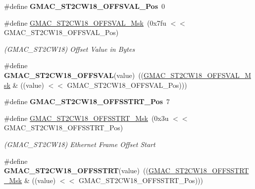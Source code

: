 \begin{DoxyCompactItemize}
\item 
\mbox{\label{group__SAME70__GMAC_ga02e7f5470d3163c67fa5af9a19ae26a8}} 
\#define {\bfseries G\+M\+A\+C\+\_\+\+S\+T2\+C\+W18\+\_\+\+O\+F\+F\+S\+V\+A\+L\+\_\+\+Pos}~0
\item 
\mbox{\label{group__SAME70__GMAC_ga2d765aad9c2975eb3297ba1ac64ab5b7}} 
\#define \mbox{\hyperlink{group__SAME70__GMAC_ga2d765aad9c2975eb3297ba1ac64ab5b7}{G\+M\+A\+C\+\_\+\+S\+T2\+C\+W18\+\_\+\+O\+F\+F\+S\+V\+A\+L\+\_\+\+Msk}}~(0x7fu $<$$<$ G\+M\+A\+C\+\_\+\+S\+T2\+C\+W18\+\_\+\+O\+F\+F\+S\+V\+A\+L\+\_\+\+Pos)
\begin{DoxyCompactList}\small\item\em (G\+M\+A\+C\+\_\+\+S\+T2\+C\+W18) Offset Value in Bytes \end{DoxyCompactList}\item 
\mbox{\label{group__SAME70__GMAC_ga65af16da3d122731540633c21a99f63b}} 
\#define {\bfseries G\+M\+A\+C\+\_\+\+S\+T2\+C\+W18\+\_\+\+O\+F\+F\+S\+V\+AL}(value)~((\mbox{\hyperlink{group__SAMV71__GMAC_ga2d765aad9c2975eb3297ba1ac64ab5b7}{G\+M\+A\+C\+\_\+\+S\+T2\+C\+W18\+\_\+\+O\+F\+F\+S\+V\+A\+L\+\_\+\+Msk}} \& ((value) $<$$<$ G\+M\+A\+C\+\_\+\+S\+T2\+C\+W18\+\_\+\+O\+F\+F\+S\+V\+A\+L\+\_\+\+Pos)))
\item 
\mbox{\label{group__SAME70__GMAC_ga1246ed3e88b926bd90dc08eae286f87d}} 
\#define {\bfseries G\+M\+A\+C\+\_\+\+S\+T2\+C\+W18\+\_\+\+O\+F\+F\+S\+S\+T\+R\+T\+\_\+\+Pos}~7
\item 
\mbox{\label{group__SAME70__GMAC_ga40187676eaa690fe2922327ed07602eb}} 
\#define \mbox{\hyperlink{group__SAME70__GMAC_ga40187676eaa690fe2922327ed07602eb}{G\+M\+A\+C\+\_\+\+S\+T2\+C\+W18\+\_\+\+O\+F\+F\+S\+S\+T\+R\+T\+\_\+\+Msk}}~(0x3u $<$$<$ G\+M\+A\+C\+\_\+\+S\+T2\+C\+W18\+\_\+\+O\+F\+F\+S\+S\+T\+R\+T\+\_\+\+Pos)
\begin{DoxyCompactList}\small\item\em (G\+M\+A\+C\+\_\+\+S\+T2\+C\+W18) Ethernet Frame Offset Start \end{DoxyCompactList}\item 
\mbox{\label{group__SAME70__GMAC_ga62780301515bccf642beae347c0b86fb}} 
\#define {\bfseries G\+M\+A\+C\+\_\+\+S\+T2\+C\+W18\+\_\+\+O\+F\+F\+S\+S\+T\+RT}(value)~((\mbox{\hyperlink{group__SAMV71__GMAC_ga40187676eaa690fe2922327ed07602eb}{G\+M\+A\+C\+\_\+\+S\+T2\+C\+W18\+\_\+\+O\+F\+F\+S\+S\+T\+R\+T\+\_\+\+Msk}} \& ((value) $<$$<$ G\+M\+A\+C\+\_\+\+S\+T2\+C\+W18\+\_\+\+O\+F\+F\+S\+S\+T\+R\+T\+\_\+\+Pos)))

\end{DoxyCompactItemize}
